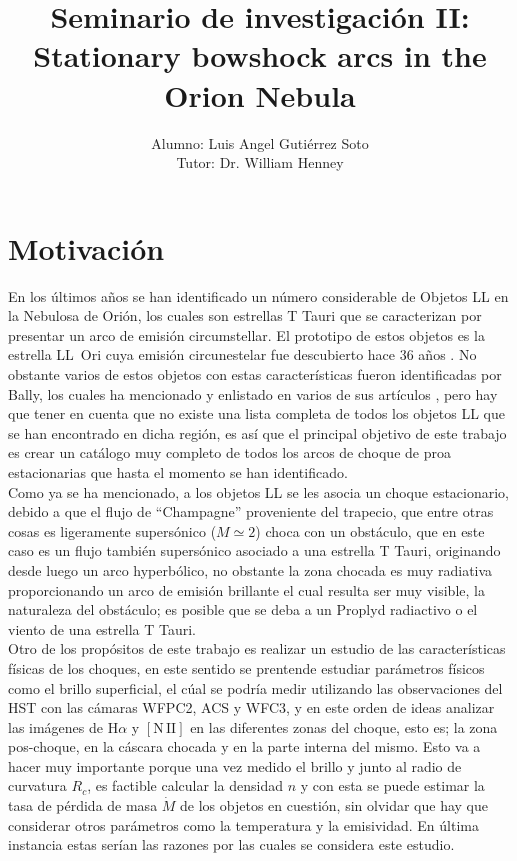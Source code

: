 \documentclass{article}
\title{Seminario de investigación II:\\ Stationary bowshock arcs in the Orion Nebula}
\author{
  Alumno: Luis Angel Gutiérrez Soto\\
  Tutor: Dr. William Henney
}
\newcommand\ha{\ensuremath{\mathrm{H}\alpha}}
\newcommand\nii{\ensuremath{\mathrm{[N\,II]}}}
\begin{document}
\maketitle

\section{Motivación}
\label{sec:motivacion}

En los últimos años se han identificado un número considerable de Objetos LL en la Nebulosa de Orión, los cuales son estrellas T Tauri que se caracterizan por presentar un arco de emisión circumstellar.
El prototipo de estos objetos es la estrella LL~Ori cuya emisión circunestelar fue descubierto hace 36 años \citep{Gull:1979a}. 
No obstante varios de estos objetos con estas características fueron identificadas por Bally, los cuales ha mencionado y enlistado en varios de sus artículos \citep{Bally:2000a, Bally:2001a, Bally:2006a}, pero hay que tener en cuenta que no existe una lista completa de todos los objetos LL que se han encontrado en dicha región, es así que el principal objetivo de este trabajo es crear un catálogo muy completo de todos los arcos de choque de proa estacionarias  que hasta el momento se han identificado.\\

Como ya se ha mencionado, a los objetos LL se les asocia un choque estacionario, debido a que el flujo de ``Champagne'' proveniente del trapecio, que entre otras cosas es ligeramente supersónico (\(M\simeq2\)) choca con un obstáculo, que en este caso es un flujo también supersónico asociado a una estrella T Tauri, originando desde luego un arco hyperbólico, no obstante la zona chocada es muy radiativa proporcionando un arco de emisión brillante el cual resulta ser muy visible, la naturaleza del obstáculo; es posible que se deba a un Proplyd radiactivo o el viento de una estrella T Tauri.\\ 


Otro de los propósitos de este trabajo es realizar un estudio de las características físicas de los choques, en este sentido se prentende estudiar parámetros físicos como el brillo superficial, el cúal se podría medir utilizando las observaciones del HST con las cámaras  WFPC2, ACS y WFC3, y en este orden de ideas analizar las imágenes de \ha{} y \nii{} en las diferentes zonas del choque, esto es; la zona pos-choque, en la cáscara chocada y en la parte interna del mismo. Esto va a hacer muy importante porque una vez medido el brillo y junto al radio de curvatura \(R_{c}\), es factible calcular la densidad \(n\) y con esta se puede  estimar la tasa de pérdida de masa \(\dot{M}\) de los objetos en cuestión, sin olvidar que hay  que considerar otros parámetros como la temperatura y la emisividad. En última instancia estas serían las razones por las cuales se considera este estudio. 
\end{document}

